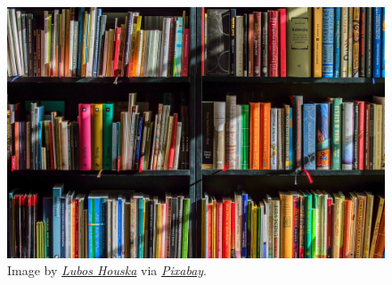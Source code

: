 \documentclass[
  letterpaper,
  DIV=11,
  numbers=noendperiod]{scrreprt}
\begin{document}
\begin{figure}[H]

{\centering \includegraphics[width=5.20833in,height=\textheight]{book/img/books.jpg}

}

\caption{Image by
\href{https://pixabay.com/users/luboshouska-198496/}{\emph{Lubos
Houska}} via
\href{https://pixabay.com/photos/books-bookstore-book-reading-1204029/}{\emph{Pixabay}}.}

\end{figure}%
\end{document}
